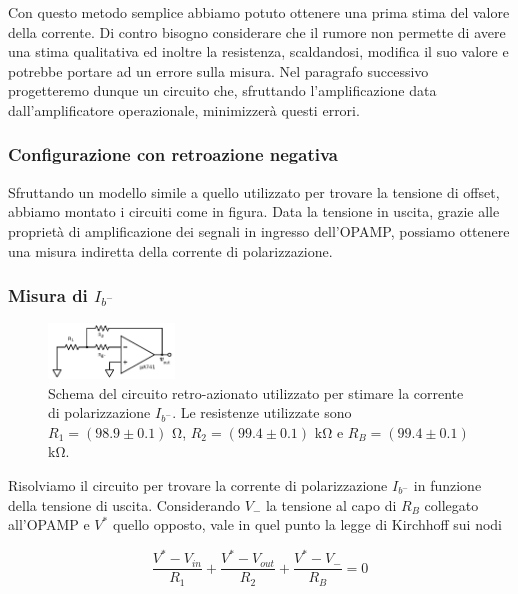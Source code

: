 Con questo metodo semplice abbiamo potuto ottenere una prima stima del valore della corrente. Di contro bisogno considerare che il rumore non permette di avere una stima qualitativa ed inoltre la resistenza, scaldandosi, modifica il suo valore e potrebbe portare ad un errore sulla misura. Nel paragrafo successivo progetteremo dunque un circuito che, sfruttando l'amplificazione data dall'amplificatore operazionale, minimizzerà questi errori.
\newpage
\subsubsection{Configurazione con retroazione negativa}

Sfruttando un modello simile a quello utilizzato per trovare la tensione di offset, abbiamo montato i circuiti come in figura. Data la tensione in uscita, grazie alle proprietà di amplificazione dei segnali in ingresso dell'OPAMP, possiamo ottenere una misura indiretta della corrente di polarizzazione.

\subsubsection*{Misura di $I_{b^-}$}

\begin{figure}
  \begin{center}
    \includegraphics[width=0.30\textwidth]{../E02/latex/inv_current.pdf}
  \end{center}
  \caption{Schema del circuito retro-azionato utilizzato per stimare la corrente di polarizzazione $I_{b^-}$. Le resistenze utilizzate sono $R_1=(98.9\pm0.1)$ \si{\ohm}, $R_2=(99.4\pm0.1)$ \si{\kilo\ohm} e $R_B=(99.4\pm0.1)$ \si{\kilo\ohm}.}
  \label{circuito:rel2_correnti_retroazione_inv}
\end{figure}

Risolviamo il circuito per trovare la corrente di polarizzazione $I_{b^-}$ in funzione della tensione di uscita. Considerando $V_{-}$ la tensione al capo di $R_B$ collegato all'OPAMP e $V^*$ quello opposto, vale in quel punto la legge di Kirchhoff sui nodi

$$\frac{V^* - V_{in}}{R_1} + \frac{V^*-V_{out}}{R_2} + \frac{V^*-V_{-}}{R_B}=0$$


